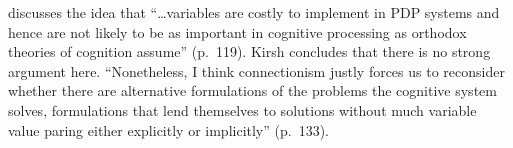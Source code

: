  discusses the idea that ``\ldots variables are costly to
implement in PDP systems and hence are not likely to be as important in
cognitive processing as orthodox theories of cognition assume'' (p.~119).
Kirsh concludes that there is no strong argument here. ``Nonetheless, I
think connectionism justly forces us to reconsider whether there are
alternative formulations of the problems the cognitive system solves,
formulations that lend themselves to solutions without much variable value
paring either explicitly or implicitly'' (p.~133).
